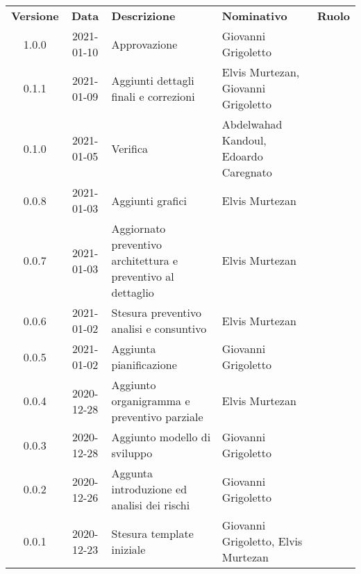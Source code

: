 {
    \renewcommand{\arraystretch}{1.5}
    \centering
    \begin{longtable}{ c c  C{3.5cm}  C{3.5cm}  c }
        \rowcolor{\primaryColor}
        \textcolor{\secondaryColor}{
        \textbf{Versione}}     & \textcolor{\secondaryColor}{\textbf{Data}}       & \textcolor{\secondaryColor}
        {\textbf{Descrizione}} & \textcolor{\secondaryColor}{\textbf{Nominativo}} & \textcolor{\secondaryColor}{\textbf{Ruolo}}                          \\


        1.0.0  & 
        2021-01-10  & 
        Approvazione & 
        Giovanni Grigoletto & 
        \responsabile{} \\

        0.1.1  & 
        2021-01-09 & 
        Aggiunti dettagli finali e correzioni & 
        Elvis Murtezan, Giovanni Grigoletto  & 
        \responsabile{} \\

        0.1.0  & 
        2021-01-05 & 
        Verifica & 
        Abdelwahad Kandoul, Edoardo Caregnato  & 
        \verificatore{} \\

        0.0.8  & 
        2021-01-03 & 
        Aggiunti grafici & 
        Elvis Murtezan  & 
        \responsabile{} \\

        0.0.7  & 
        2021-01-03 & 
        Aggiornato preventivo architettura e preventivo al dettaglio & 
        Elvis Murtezan  & 
        \responsabile{} \\

        0.0.6  & 
        2021-01-02 & 
        Stesura preventivo analisi e consuntivo & 
        Elvis Murtezan  & 
        \responsabile{} \\

        0.0.5  & 
        2021-01-02 & 
        Aggiunta pianificazione & 
        Giovanni Grigoletto & 
        \responsabile{} \\

        0.0.4  & 
        2020-12-28 & 
        Aggiunto organigramma e preventivo parziale & 
        Elvis Murtezan  & 
        \responsabile{} \\

        0.0.3  & 
        2020-12-28 & 
        Aggiunto modello di sviluppo & 
        Giovanni Grigoletto & 
        \responsabile{} \\
        
        0.0.2  & 
        2020-12-26 & 
        Aggunta introduzione ed analisi dei rischi & 
        Giovanni Grigoletto & 
        \responsabile{} \\

        0.0.1  & 
        2020-12-23 & 
        Stesura template iniziale & 
        Giovanni Grigoletto, Elvis Murtezan & 
        \responsabile{} \\
    \end{longtable}
}